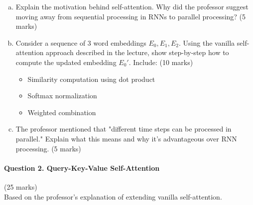 \documentclass[12pt]{article}
\newcommand{\mediumanswer}{\vspace{3cm}}
\newcommand{\journalspace}{\vspace{4.5cm}}
\begin{document}
\begin{enumerate}[(a)]
    \item Explain the motivation behind self-attention. Why did the professor suggest moving away from sequential processing in RNNs to parallel processing? \hfill (5 marks)
    
    \mediumanswer
    
    \item Consider a sequence of 3 word embeddings $E_0, E_1, E_2$. Using the vanilla self-attention approach described in the lecture, show step-by-step how to compute the updated embedding $E_0'$. Include: \hfill (10 marks)
    \begin{itemize}
        \item Similarity computation using dot product
        \item Softmax normalization 
        \item Weighted combination
    \end{itemize}
    
    \journalspace
    
    \item The professor mentioned that "different time steps can be processed in parallel." Explain what this means and why it's advantageous over RNN processing. \hfill (5 marks)
    
    \mediumanswer
\end{enumerate}

\newpage
\paragraph{Question 2. Query-Key-Value Self-Attention}\hfill (25 marks)\\
Based on the professor's explanation of extending vanilla self-attention.
\end{document}
